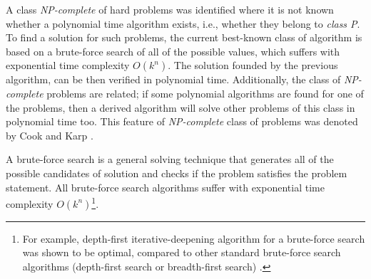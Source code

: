 A class \emph{NP-complete} of hard problems was identified where it is not known whether a polynomial time algorithm exists, i.e., whether they belong to \emph{class P}. 
To find a solution for such problems, the current best-known class of algorithm is based on a brute-force search of all of the possible values, which suffers with exponential time complexity $O(k^n)$. 
The solution founded by the previous algorithm, can be then verified in polynomial time. 
Additionally, the class of \emph{NP-complete} problems are related; if some polynomial algorithms are found for one of the problems, then a derived algorithm will solve other problems of this class in polynomial time too. 
This feature of \emph{NP-complete} class of problems was denoted by Cook and Karp \cite{Cook1971,Karp1972}. 

A brute-force search is a general solving technique that generates all of the possible candidates of solution and checks if the problem satisfies the problem statement. All brute-force search algorithms suffer with exponential time complexity $O(k^n)$\footnote{For example, depth-first iterative-deepening algorithm for a brute-force search was shown to be optimal, compared to other standard brute-force search algorithms (depth-first search or breadth-first search) \cite{Korf1985,Pearl1987}.}.


